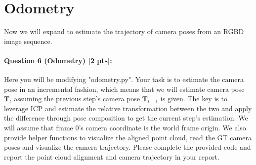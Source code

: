 \documentclass[11pt]{article}
\begin{document}
\pagebreak

\section*{Odometry} 
Now we will expand to estimate the trajectory of camera poses from an RGBD image sequence.

\paragraph{Question 6 (Odometry) [2 pts]:}
Here you will be modifying "odometry.py". Your task is to estimate the camera pose in an incremental fashion, which means that we will estimate camera pose $\mathbf{T}_t$ assuming the previous step's camera pose $\mathbf{T}_{t-1}$ is given. The key is to leverage ICP and estimate the relative transformation between the two and apply the difference through pose composition to get the current step's estimation. We will assume that frame 0's camera coordinate is the world frame origin. We also provide helper functions to visualize the aligned point cloud, read the GT camera poses and visualize the camera trajectory. Please complete the provided code and report the point cloud alignment and camera trajectory in your report. 
\end{document}
